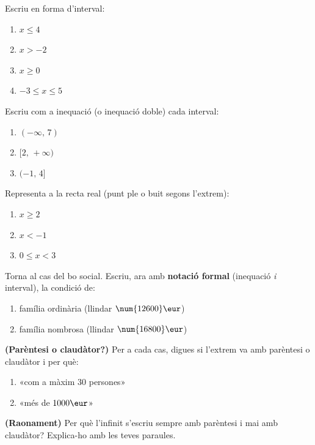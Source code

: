 \begin{exercicis}
\begin{exlist}
  \item Escriu en forma d'interval:
        \begin{enumerate}[label=\alph*), leftmargin=1.6em, topsep=2pt]
          \item $x\le 4$ \hfill \item $x>-2$ \hfill \item $x\ge 0$ \hfill \item $-3\le x\le 5$
        \end{enumerate}
  \item Escriu com a inequació (o inequació doble) cada interval:
        \begin{enumerate}[label=\alph*), leftmargin=1.6em, topsep=2pt]
          \item $(-\infty,\,7)$ \hfill \item $[2,\,+\infty)$ \hfill \item $(-1,\,4]$
        \end{enumerate}
  \item Representa a la recta real (punt ple o buit segons l'extrem):
        \begin{enumerate}[label=\alph*), leftmargin=1.6em, topsep=2pt]
          \item $x\ge 2$ \hfill \item $x<-1$ \hfill \item $0\le x<3$
        \end{enumerate}
  \item Torna al cas del bo social. Escriu, ara amb \textbf{notació formal} (inequació
        \emph{i} interval), la condició de:
        \begin{enumerate}[label=\alph*), leftmargin=1.6em, topsep=2pt]
          \item família ordinària (llindar $\num{12600}\eur$)
          \item família nombrosa (llindar $\num{16800}\eur$)
        \end{enumerate}
  \item \textbf{(Parèntesi o claudàtor?)} Per a cada cas, digues si l'extrem va amb
        parèntesi o claudàtor i per què:
        \begin{enumerate}[label=\alph*), leftmargin=1.6em, topsep=2pt]
          \item «com a màxim $30$ persones»
          \item «més de $1000\eur$»
        \end{enumerate}
  \item \textbf{(Raonament)} Per què l'infinit s'escriu sempre amb parèntesi i mai amb
        claudàtor? Explica-ho amb les teves paraules.
\end{exlist}
\end{exercicis}

